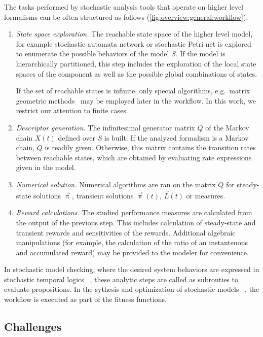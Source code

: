 The tasks performed by stochastic analysis tools that operate on
higher level formalisms can be often structured as follows
(\vref{fig:overview:general:workflow}):
\begin{enumerate}
\item \emph{State space exploration.} The reachable state space of the
  higher level model, for example stochastic automata network or
  stochastic Petri net is explored to enumerate the possible behaviors of the model $S$. If the model is hierarchically partitioned, this step includes the exploration of the local state
  spaces of the component as well as the possible global combinations
  of states.

  If the set of reachable states is infinite, only special algorithms,
  e.g.~matrix geometric methods~\citep{haverkort1995matrix} may be
  employed later in the workflow. In this work, we restrict our
  attention to finite cases.
\item \emph{Descriptor generation.} The infinitesimal generator matrix
  $Q$ of the Markov chain $X(t)$ defined over $S$ is built. If the
  analyzed formalism is a Markov chain, $Q$ is readily
  given. Otherwise, this matrix contains the transition rates between
  reachable states, which are obtained by evaluating rate expressions
  given in the model.
\item \emph{Numerical solution.} Numerical algorithms are ran on the
  matrix $Q$ for steady-state solutions $\vec{\uppi}$, transient
  solutions $\vec{\uppi}(t)$, $\vec{L}(t)$ or  measures.
\item \emph{Reward calculations.} The studied performance measures are
  calculated from the output of the previous step. This includes
  calculation of steady-state and transient rewards and sensitivities
  of the rewards. Additional algebraic manipulations (for example, the
  calculation of the ratio of an instantenous and accumulated reward)
  may be provided to the modeler for convenience.

\end{enumerate}

In stochastic model checking, where the desired system behaviors are
expressed in stochastic temporal logics%
~\citep{bianco1995model,baier1999approximative}, these analytic steps
are called as subrouties to evaluate propositions. In the sythesis and
optimization of stochastic models%
~\citep{DBLP:journals/jacm/ChatterjeeHJ015}, the workflow is executed
as part of the fitness functions.

\subsection{Challenges}

